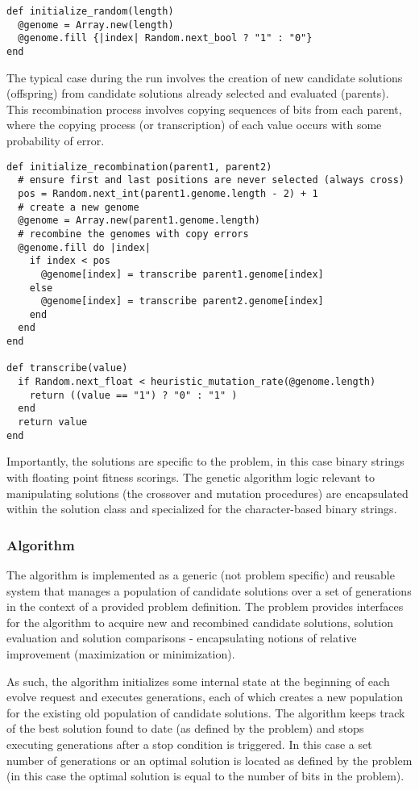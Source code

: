\begin{lstlisting}
def initialize_random(length)
  @genome = Array.new(length)
  @genome.fill {|index| Random.next_bool ? "1" : "0"}
end
\end{lstlisting}

The typical case during the run involves the creation of new candidate solutions (offspring) from candidate solutions already selected and evaluated (parents). This recombination process involves copying sequences of bits from each parent, where the copying process (or transcription) of each value occurs with some probability of error.

\begin{lstlisting}
def initialize_recombination(parent1, parent2)
  # ensure first and last positions are never selected (always cross)
  pos = Random.next_int(parent1.genome.length - 2) + 1
  # create a new genome
  @genome = Array.new(parent1.genome.length)
  # recombine the genomes with copy errors
  @genome.fill do |index|
    if index < pos
      @genome[index] = transcribe parent1.genome[index]
    else
      @genome[index] = transcribe parent2.genome[index]
    end
  end
end

def transcribe(value)
  if Random.next_float < heuristic_mutation_rate(@genome.length)
    return ((value == "1") ? "0" : "1" )
  end
  return value
end
\end{lstlisting}

Importantly, the solutions are specific to the problem, in this case binary strings with floating point fitness scorings. The genetic algorithm logic relevant to manipulating solutions (the crossover and mutation procedures) are encapsulated within the solution class and specialized for the character-based binary strings.

\subsubsection{Algorithm}
The algorithm is implemented as a generic (not problem specific) and reusable system that manages a population of candidate solutions over a set of generations in the context of a provided problem definition. The problem provides interfaces for the algorithm to acquire new and recombined candidate solutions, solution evaluation and solution comparisons - encapsulating notions of relative improvement (maximization or minimization). 

As such, the algorithm initializes some internal state at the beginning of each evolve request and executes generations, each of which creates a new population for the existing old population of candidate solutions. The algorithm keeps track of the best solution found to date (as defined by the problem) and stops executing generations after a stop condition is triggered. In this case a set number of generations or an optimal solution is located as defined by the problem (in this case the optimal solution is equal to the number of bits in the problem).

